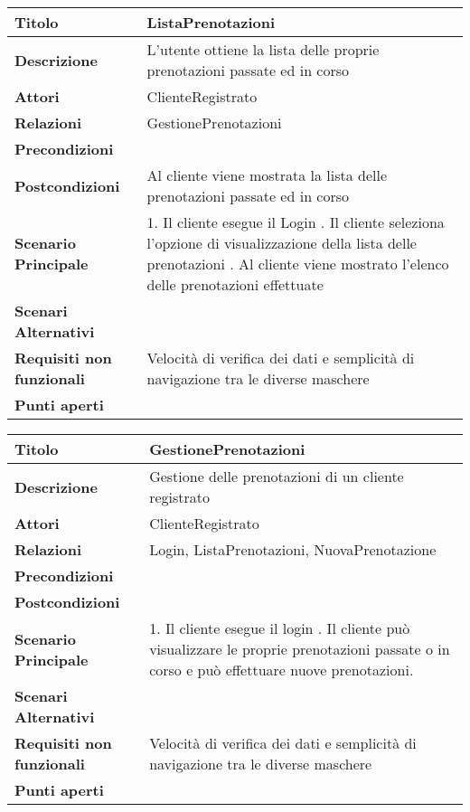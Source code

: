 \begin{tabular} {|P{4.5cm}|P{12.5cm}|}
\hline
  \textbf{Titolo} & ListaPrenotazioni\\
\hline
  \textbf{Descrizione} & L'utente ottiene la lista delle proprie prenotazioni passate ed in corso\\
\hline
 \textbf{Attori} & ClienteRegistrato\\
\hline
  \textbf{Relazioni} & GestionePrenotazioni\\
\hline
  \textbf{Precondizioni} &\\
\hline
  \textbf{Postcondizioni} & Al cliente viene mostrata la lista delle prenotazioni passate ed in corso\\
\hline
  \textbf{Scenario Principale} & 1. Il cliente esegue il Login . Il cliente seleziona l'opzione di visualizzazione della lista delle prenotazioni . Al cliente viene mostrato l'elenco delle prenotazioni effettuate\\
\hline
  \textbf{Scenari Alternativi} &\\
\hline
  \textbf{Requisiti non funzionali} & Velocità di verifica dei dati e semplicità di navigazione tra le diverse maschere\\
\hline
  \textbf{Punti aperti} &\\
\hline
\end{tabular}
\hfill
\break


\begin{tabular} {|P{4.5cm}|P{12.5cm}|}
\hline
  \textbf{Titolo} & GestionePrenotazioni\\
\hline
  \textbf{Descrizione} & Gestione delle prenotazioni di un cliente registrato\\
\hline
  \textbf{Attori} & ClienteRegistrato\\
\hline
  \textbf{Relazioni} & Login, ListaPrenotazioni, NuovaPrenotazione\\
\hline
  \textbf{Precondizioni} &\\
\hline
  \textbf{Postcondizioni} &\\
\hline
  \textbf{Scenario Principale} & 1. Il cliente esegue il login . Il cliente può visualizzare le proprie prenotazioni passate o in corso e può effettuare nuove prenotazioni.\\
\hline
  \textbf{Scenari Alternativi} &\\
\hline
  \textbf{Requisiti non funzionali} & Velocità di verifica dei dati e semplicità di navigazione tra le diverse maschere\\
\hline
  \textbf{Punti aperti} &\\
\hline
\end{tabular}

